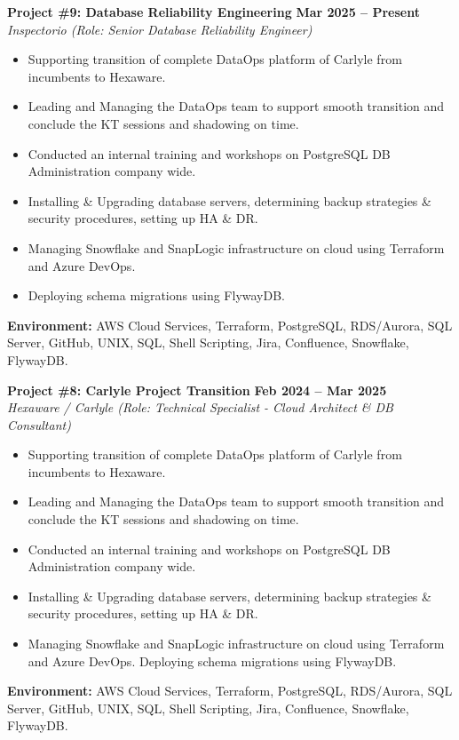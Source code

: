 \documentclass[10pt,a4paper]{article}
\begin{document}
\noindent
\begin{minipage}{\textwidth}
    \textbf{\large Project \#9: Database Reliability Engineering} \hfill \textbf{Mar 2025 -- Present} \\
    \textit{Inspectorio (Role: Senior Database Reliability Engineer)}
    \begin{itemize}[leftmargin=*, noitemsep, topsep=2pt]
        \item Supporting transition of complete DataOps platform of Carlyle from incumbents to Hexaware.
        \item Leading and Managing the DataOps team to support smooth transition and conclude the KT sessions and shadowing on time.
        \item Conducted an internal training and workshops on PostgreSQL DB Administration company wide.
        \item Installing \& Upgrading database servers, determining backup strategies \& security procedures, setting up HA \& DR.
        \item Managing Snowflake and SnapLogic infrastructure on cloud using Terraform and Azure DevOps.
        \item Deploying schema migrations using FlywayDB.
    \end{itemize}
    \small{\textbf{Environment:} AWS Cloud Services, Terraform, PostgreSQL, RDS/Aurora, SQL Server, GitHub, UNIX, SQL, Shell Scripting, Jira, Confluence, Snowflake, FlywayDB.}
\end{minipage}
\vspace{10pt}

\noindent
\begin{minipage}{\textwidth}
    \textbf{\large Project \#8: Carlyle Project Transition} \hfill \textbf{Feb 2024 -- Mar 2025} \\
    \textit{Hexaware / Carlyle (Role: Technical Specialist - Cloud Architect \& DB Consultant)}
    \begin{itemize}[leftmargin=*, noitemsep, topsep=2pt]
        \item Supporting transition of complete DataOps platform of Carlyle from incumbents to Hexaware.
        \item Leading and Managing the DataOps team to support smooth transition and conclude the KT sessions and shadowing on time.
        \item Conducted an internal training and workshops on PostgreSQL DB Administration company wide.
        \item Installing \& Upgrading database servers, determining backup strategies \& security procedures, setting up HA \& DR.
        \item Managing Snowflake and SnapLogic infrastructure on cloud using Terraform and Azure DevOps. Deploying schema migrations using FlywayDB.
    \end{itemize}
    \small{\textbf{Environment:} AWS Cloud Services, Terraform, PostgreSQL, RDS/Aurora, SQL Server, GitHub, UNIX, SQL, Shell Scripting, Jira, Confluence, Snowflake, FlywayDB.}
\end{minipage}
\vspace{10pt}
\end{document}
